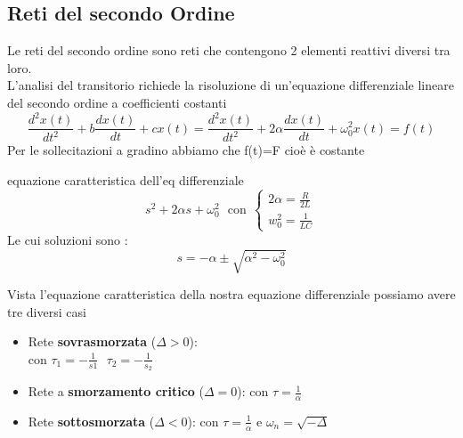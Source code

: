 \documentclass{article}
\theoremstyle{definition}
\begin{document}
\subsection{Reti del secondo Ordine }
Le reti del secondo ordine sono reti che contengono 2 elementi reattivi diversi tra loro.\\
L'analisi del transitorio richiede la risoluzione di un'equazione differenziale lineare del secondo ordine a coefficienti costanti 
$$\frac{d^2 x(t)}{dt^2}+b\frac{d x(t)}{dt}+c x(t)=\frac{d^2 x(t)}{dt^2}+2\alpha\frac{dx(t)}{dt}+\omega^2_0 x(t)=f(t)
$$
Per le sollecitazioni a gradino abbiamo che f(t)=F cioè è costante\\
\begin{teo*}{equazione caratteristica dell'eq differenziale}
$$s^2+2\alpha s+\omega^2_0 \ \ \ \text{con} \ \ \begin{cases}
2\alpha=\frac{R}{2L}\\
w_0^2=\frac{1}{LC}
\end{cases}$$
Le cui soluzioni sono : 
$$s=-\alpha\pm \sqrt{\alpha^2-\omega^2_0}$$
\end{teo*}
Vista l'equazione caratteristica della nostra equazione differenziale possiamo avere tre diversi casi 
\begin{itemize}
\item Rete \textbf{sovrasmorzata}  ($\Delta >0$):
 \\con $\tau_1=-\frac{1}{s1} \ \ \ \tau_2=-\frac{1}{s_2}$
\item Rete a \textbf{smorzamento critico} ($\Delta = 0$):
 con $\tau=\frac{1}{\alpha}$
\item Rete \textbf{sottosmorzata} ($\Delta < 0$):
 con $\tau=\frac{1}{\alpha}$  e $\omega_n=\sqrt{-\Delta}$
\end{itemize}
\end{document}
